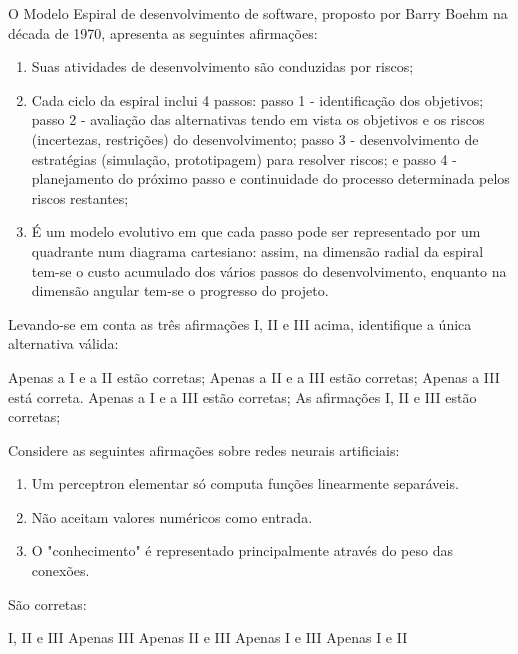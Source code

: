 \documentclass[12pt, addpoints]{exam}
\begin{document}
\begin{questions}
\question

O Modelo Espiral de desenvolvimento de software, proposto por Barry Boehm na década de 1970, apresenta as seguintes afirmações:

\begin{enumerate}[label=\Roman*.]

    \item Suas atividades de desenvolvimento são conduzidas por riscos;

    \item Cada ciclo da espiral inclui 4 passos: passo 1 - identificação dos objetivos; passo 2 - avaliação das alternativas tendo em vista os objetivos e os riscos (incertezas, restrições) do desenvolvimento; passo 3 - desenvolvimento de estratégias (simulação, prototipagem) para resolver riscos; e passo 4 - planejamento do próximo passo e continuidade do processo determinada pelos riscos restantes;

    \item É um modelo evolutivo em que cada passo pode ser representado por um quadrante num diagrama cartesiano: assim, na dimensão radial da espiral tem-se o custo acumulado dos vários passos do desenvolvimento, enquanto na dimensão angular tem-se o progresso do projeto.

\end{enumerate}

Levando-se em conta as três afirmações I, II e III acima, identifique a única alternativa válida:


\begin{choices}
\choice Apenas a I e a II estão corretas;
\choice Apenas a II e a III estão corretas;
\choice Apenas a III está correta.
\choice Apenas a I e a III estão corretas;
\choice As afirmações I, II e III estão corretas;
\end{choices}

\question

Considere as seguintes afirmações sobre redes neurais artificiais: \begin{enumerate}[label=\Roman*.] \item Um perceptron elementar só computa funções linearmente separáveis. \item Não aceitam valores numéricos como entrada. \item O "conhecimento" é representado principalmente através do peso das conexões. \end{enumerate} São corretas:
\begin{choices}
\choice I, II e III
\choice Apenas III
\choice Apenas II e III
\choice Apenas I e III
\choice Apenas I e II 
\end{choices}


\end{questions}
\end{document}
